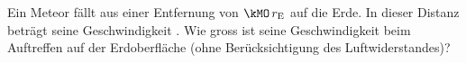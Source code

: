 Ein Meteor fällt aus einer Entfernung von $\kMO\,r_\mathrm{E}$ auf die Erde. In dieser Distanz beträgt seine Geschwindigkeit \vAO. Wie gross ist seine Geschwindigkeit beim Auftreffen auf der Erdoberfläche (ohne Berücksichtigung des Luftwiderstandes)?
